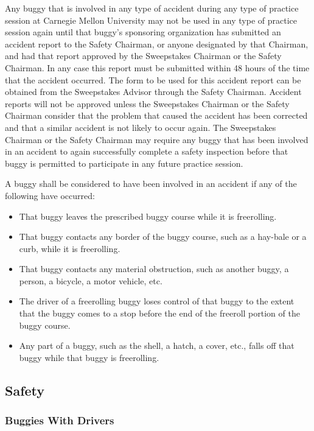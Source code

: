 Any buggy that is involved in any type of accident during any type of practice session at Carnegie Mellon University may not be used in any type of practice session again until that buggy's sponsoring organization has submitted an accident report to the Safety Chairman, or anyone designated by that Chairman, and had that report approved by the Sweepstakes Chairman or the Safety Chairman. In any case this report must be submitted within 48 hours of the time that the accident occurred. The form to be used for this accident report can be obtained from the Sweepstakes Advisor through the Safety Chairman. Accident reports will not be approved unless the Sweepstakes Chairman or the Safety Chairman consider that the problem that caused the accident has been corrected and that a similar accident is not likely to occur again. The Sweepstakes Chairman or the Safety Chairman may require any buggy that has been involved in an accident to again successfully complete a safety inspection before that buggy is permitted to participate in any future practice session.

A buggy shall be considered to have been involved in an accident if any of the following have occurred:
\begin{itemize}
	\item That buggy leaves the prescribed buggy course while it is freerolling.
	\item That buggy contacts any border of the buggy course, such as a hay-bale or a curb, while it is freerolling.
	\item That buggy contacts any material obstruction, such as another buggy, a person, a bicycle, a motor vehicle, etc.
	\item The driver of a freerolling buggy loses control of that buggy to the extent that the buggy comes to a stop before the end of the freeroll portion of the buggy course.
	\item Any part of a buggy, such as the shell, a hatch, a cover, etc., falls off that buggy while that buggy is freerolling.
\end{itemize}

\subsection{Safety}

\subsubsection{Buggies With Drivers}

